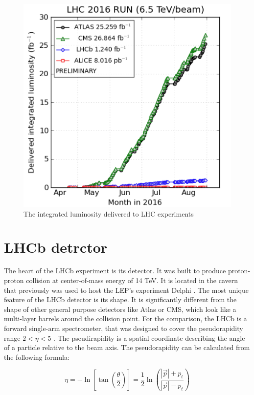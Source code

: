 \begin{figure}
\centering
\includegraphics[scale=0.5]{figures/Luminosity.png}
\caption[Luminosity]{The integrated luminosity delivered to LHC experiments
\label{fig:Luminosity}}
\end{figure}


\section{LHCb detrctor}

The heart of the LHCb experiment is its detector. It was built to produce proton-proton collision at center-of-mass energy of 14 TeV. It is located in the cavern that previously was used to host the LEP's experiment Delphi \cite{deplhi}. The most unique feature of the LHCb detector is its shape. It is significantly different from the shape of other general purpose detectors like Atlas or CMS, which look like a multi-layer barrels around the collision point. For the comparison, the LHCb is a forward single-arm spectrometer, that was designed to cover the pseudorapidity range $2< \eta < 5 $  \cite{lhcb}. The pseudirapidity is a spatial coordinate describing the angle of a particle relative to the beam axis. The  pseudorapidity can be calculated from the following formula: 

\begin{equation}
    \eta = - \ln\left[ \tan \left( \frac{\theta }{2}\right) \right]\nonumber = \frac{1}{2} \ln \left( \frac{|\vec{p}|+ p_t}{|\vec{p}|- p_t}  \right)
    \label{eq:eta}
\end{equation}

